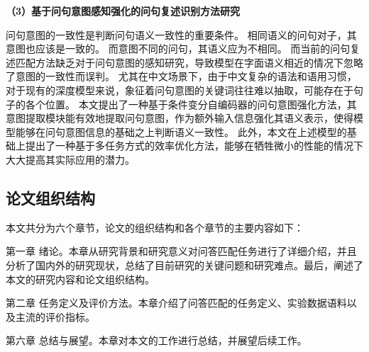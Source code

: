 \textbf{\songti （3）基于问句意图感知强化的问句复述识别方法研究}

问句意图的一致性是判断问句语义一致性的重要条件。
相同语义的问句对子，其意图也应该是一致的。
而意图不同的问句，其语义应为不相同。
而当前的问句复述匹配方法缺乏对于问句意图的感知研究，导致模型在字面语义相近的情况下忽略了意图的一致性而误判。
尤其在中文场景下，由于中文复杂的语法和语用习惯，对于现有的深度模型来说，象征着问句意图的关键词往往难以抽取，可能存在于句子的各个位置。
本文提出了一种基于条件变分自编码器的问句意图强化方法，其意图提取模块能有效地提取问句意图，作为额外输入信息强化其语义表示，使得模型能够在问句意图信息的基础之上判断语义一致性。
此外，本文在上述模型的基础上提出了一种基于多任务方式的效率优化方法，能够在牺牲微小的性能的情况下大大提高其实际应用的潜力。


\subsection{论文组织结构}

本文共分为六个章节，论文的组织结构和各个章节的主要内容如下：

第一章 \quad 绪论。本章从研究背景和研究意义对问答匹配任务进行了详细介绍，并且分析了国内外的研究现状，总结了目前研究的关键问题和研究难点。最后，阐述了本文的研究内容和论文组织结构。

第二章 \quad 任务定义及评价方法。本章介绍了问答匹配的任务定义、实验数据语料以及主流的评价指标。




第六章 \quad 总结与展望。本章对本文的工作进行总结，并展望后续工作。



